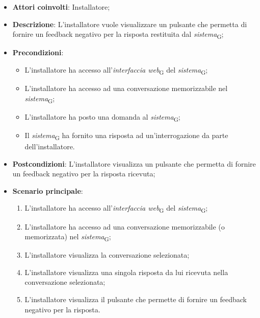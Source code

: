 \begin{itemize}
    \item \textbf{Attori coinvolti}: Installatore;
    \item \textbf{Descrizione}: L'installatore vuole visualizzare un pulsante che permetta di fornire un feedback negativo per la risposta restituita dal \textit{sistema}\textsubscript{G};
    \item \textbf{Precondizioni}: 
    \begin{itemize}
        \item L’installatore ha accesso all’\textit{interfaccia web}\textsubscript{G} del \textit{sistema}\textsubscript{G};
        \item L’installatore ha accesso ad una conversazione memorizzabile nel \textit{sistema}\textsubscript{G};
        \item L'installatore ha posto una domanda al \textit{sistema}\textsubscript{G};
        \item Il \textit{sistema}\textsubscript{G} ha fornito una risposta ad un’interrogazione da parte dell’installatore.
    \end{itemize}
    \item \textbf{Postcondizioni}: L'installatore visualizza un pulsante che permetta di fornire un feedback negativo per la risposta ricevuta;
    \item \textbf{Scenario principale}:
    \begin{enumerate}
        \item L’installatore ha accesso all’\textit{interfaccia web}\textsubscript{G} del \textit{sistema}\textsubscript{G};
        \item L’installatore ha accesso ad una conversazione memorizzabile (o memorizzata) nel \textit{sistema}\textsubscript{G};
        \item L'installatore visualizza la conversazione selezionata;
        \item L'installatore visualizza una singola risposta da lui ricevuta nella conversazione selezionata;
        \item L'installatore visualizza il pulsante che permette di fornire un feedback negativo per la risposta.
    \end{enumerate}
\end{itemize}


